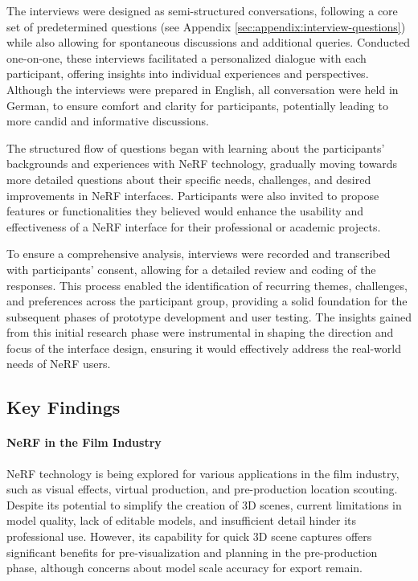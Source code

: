 The interviews were designed as semi-structured conversations, following a core set of predetermined questions (see Appendix \ref{sec:appendix:interview-questions}) while also allowing for spontaneous discussions and additional queries. 
Conducted one-on-one, these interviews facilitated a personalized dialogue with each participant, offering insights into individual experiences and perspectives. 
Although the interviews were prepared in English, all conversation were held in German, to ensure comfort and clarity for participants, potentially leading to more candid and informative discussions.

The structured flow of questions began with learning about the participants' backgrounds and experiences with NeRF technology, gradually moving towards more detailed questions about their specific needs, challenges, and desired improvements in NeRF interfaces. 
Participants were also invited to propose features or functionalities they believed would enhance the usability and effectiveness of a NeRF interface for their professional or academic projects.

To ensure a comprehensive analysis, interviews were recorded and transcribed with participants' consent, allowing for a detailed review and coding of the responses. 
This process enabled the identification of recurring themes, challenges, and preferences across the participant group, providing a solid foundation for the subsequent phases of prototype development and user testing. 
The insights gained from this initial research phase were instrumental in shaping the direction and focus of the interface design, ensuring it would effectively address the real-world needs of NeRF users.

\subsection*{Key Findings}
\label{sec:methodology:user-research:findings}

\paragraph{NeRF in the Film Industry}

NeRF technology is being explored for various applications in the film industry, such as visual effects, virtual production, and pre-production location scouting. 
Despite its potential to simplify the creation of 3D scenes, current limitations in model quality, lack of editable models, and insufficient detail hinder its professional use. 
However, its capability for quick 3D scene captures offers significant benefits for pre-visualization and planning in the pre-production phase, although concerns about model scale accuracy for export remain.


